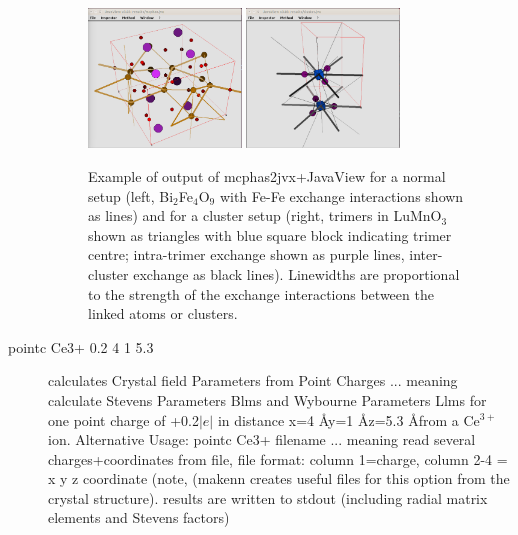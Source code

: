 \begin{description}
\begin{figure}[htb]%
\begin{center}\leavevmode
\includegraphics[angle=0, width=0.4\textwidth]{figsrc/mcphas_jvx.eps}
\includegraphics[angle=0, width=0.4\textwidth]{figsrc/trimer_jvx.eps}
\end{center}
\caption{Example of output of mcphas2jvx+JavaView for a normal setup (left, Bi$_2$Fe$_4$O$_9$ with Fe-Fe exchange interactions shown as
lines) and for a cluster setup (right, trimers in LuMnO$_3$ shown as triangles with blue square block indicating trimer centre; intra-trimer
exchange shown as purple lines, inter-cluster exchange as black lines). Linewidths are proportional to the strength of the exchange 
interactions between the linked atoms or clusters.}
\label{mcphas2jvx}
\end{figure}

\item [\prg pointc\index{pointc} Ce3+ 0.2 4 1 5.3]
              calculates Crystal field Parameters from Point Charges  
                 ... meaning calculate Stevens Parameters Blms 
                                  and Wybourne Parameters Llms
                 for one point charge of +0.2$|e|$ in distance
                 x=4 \AA y=1 \AA z=5.3 \AA from a Ce$^{3+}$ ion.
                Alternative Usage: pointc Ce3+ filename
                 ... meaning read several charges+coordinates from file,
                 file format: column 1=charge, column 2-4 = x y z coordinate  (note,
				 ({\prg makenn} creates useful files for this option from the crystal %
structure).
                results are written to stdout (including radial matrix elements and Stevens %
factors)


\end{description}

